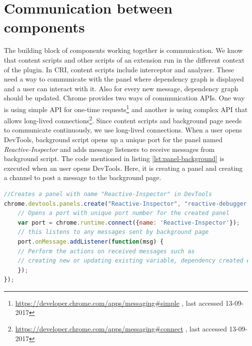 \section{Communication between components}
The building block of components working together is communication. We know that content scripts and other scripts of an extension run in the different context of the plugin. In CRI, content scripts include interceptor and analyzer. These need a way to communicate with the panel where dependency graph is displayed and a user can interact with it. Also for every new message, dependency graph should be updated. Chrome provides two ways of communication APIs.  One way is using simple API for one-time requests\footnote{\url{https://developer.chrome.com/apps/messaging\#simple} , last accessed 13-09-2017} and another is using complex API that allows long-lived connections\footnote{\url{https://developer.chrome.com/apps/messaging\#connect} , last accessed 13-09-2017}. Since content scripts and background page needs to communicate continuously, we use long-lived connections. When a user opens DevTools, background script opens up a unique port for the panel named \textit{Reactive-Inspector} and adds message listeners to receive messages from background script. The code mentioned in listing \ref{lst:panel-background} is executed when an user opens DevTools. Here, it is creating a panel and creating a channel to post a message to the background page.

\begin{lstlisting}[language=JavaScript, caption=Creating a channel for communication between Panel and Background pages, label={lst:panel-background}]
//Creates a panel with name "Reactive-Inspector" in DevTools
chrome.devtools.panels.create("Reactive-Inspector", "reactive-debugger.png", "panel.html", function (extensionPanel) {
	// Opens a port with unique port number for the created panel
	var port = chrome.runtime.connect({name: 'Reactive-Inspector'});
	// this listens to any messages sent by background page
	port.onMessage.addListener(function(msg) {
	// Perform the actions on received messages such as
	// creating new or updating existing variable, dependency created etc.
	});
});

\end{lstlisting}

